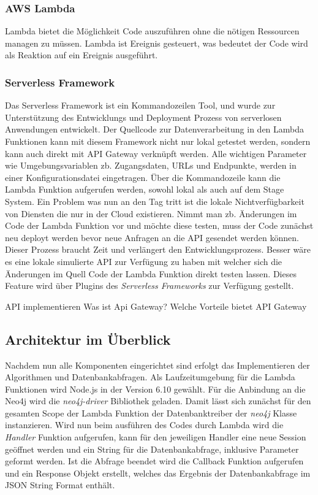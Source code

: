 \subsubsection{AWS Lambda}

Lambda bietet die Möglichkeit Code auszuführen ohne die nötigen Ressourcen managen zu müssen. Lambda ist Ereignis gesteuert, was bedeutet der Code wird als Reaktion auf ein Ereignis ausgeführt. 
\subsubsection{Serverless Framework}
Das Serverless Framework ist ein Kommandozeilen Tool, und wurde zur Unterstützung des Entwicklungs und Deployment Prozess von serverlosen Anwendungen entwickelt. 
Der Quellcode zur Datenverarbeitung in den Lambda Funktionen kann mit diesem Framework nicht nur lokal getestet werden, sondern kann auch direkt mit API Gateway verknüpft werden. Alle wichtigen Parameter wie Umgebungsvariablen zb. Zugangsdaten, URLs und Endpunkte, werden in einer Konfigurationsdatei eingetragen.  Über die Kommandozeile kann die Lambda Funktion aufgerufen werden, sowohl lokal als auch auf dem Stage System. 
Ein Problem was nun an den Tag tritt ist die lokale Nichtverfügbarkeit von Diensten die nur in der Cloud existieren. Nimmt man zb. Änderungen im Code der Lambda Funktion vor und möchte diese testen, muss der Code zunächst neu deployt werden bevor neue Anfragen an die API gesendet werden können. Dieser Prozess braucht Zeit und verlängert den Entwicklungsprozess. Besser wäre es eine lokale simulierte API zur Verfügung zu haben mit welcher sich die Änderungen im Quell Code der Lambda Funktion direkt testen lassen. Dieses Feature wird über Plugins des \textit{Serverless Frameworks} zur Verfügung gestellt.

API implementieren
Was ist Api Gateway?
Welche Vorteile bietet API Gateway


\subsection{Architektur im Überblick}



Nachdem nun alle Komponenten eingerichtet sind erfolgt das Implementieren der Algorithmen und Datenbankabfragen. Als Laufzeitumgebung für die Lambda Funktionen wird Node.js in der Version 6.10 gewählt. Für die Anbindung an die Neo4j wird die \textit{neo4j-driver} Bibliothek geladen. Damit lässt sich zunächst für den gesamten Scope der Lambda Funktion der Datenbanktreiber der \textit{neo4j} Klasse instanzieren. 
Wird nun beim ausführen des Codes durch Lambda wird die \textit{Handler} Funktion aufgerufen, kann für den jeweiligen Handler eine neue Session geöffnet werden und ein String für die Datenbankabfrage, inklusive Parameter geformt werden. Ist die Abfrage beendet wird die Callback Funktion aufgerufen und ein Response Objekt erstellt, welches das Ergebnis der Datenbankabfrage im JSON String Format enthält.

